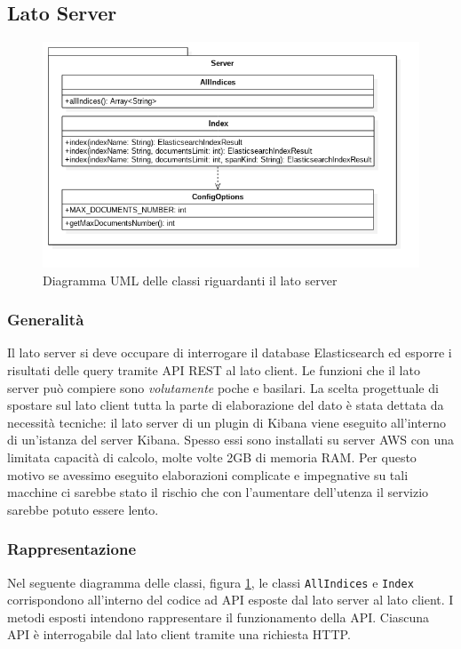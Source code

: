 
\subsection{Lato Server}


\begin{figure}[H]
	\centering
	\includegraphics[width=1\textwidth]{Images/DiagrammaClassiServer.png}
	\caption{Diagramma UML delle classi riguardanti il lato server}
	\label{img:diagrammaClassiServer}
\end{figure}

\subsubsection{Generalità}
Il lato server si deve occupare di interrogare il database Elasticsearch ed esporre i risultati delle query tramite API REST al lato client. Le funzioni che il lato server può compiere sono \emph{volutamente}  poche e basilari. La scelta progettuale di spostare sul lato client tutta la parte di elaborazione del dato è stata dettata da necessità tecniche: il lato server di un plugin di Kibana viene eseguito all'interno di un'istanza del server Kibana. Spesso essi sono installati su server AWS con una limitata capacità di calcolo, molte volte 2GB di memoria RAM. Per questo motivo se avessimo eseguito elaborazioni complicate e impegnative su tali macchine ci sarebbe stato il rischio che con l'aumentare dell'utenza il servizio sarebbe potuto essere lento.

\subsubsection{Rappresentazione}
Nel seguente diagramma delle classi, figura \ref{img:diagrammaClassiServer}, le classi \texttt{AllIndices} e \texttt{Index} corrispondono all'interno del codice ad API esposte dal lato server al lato client. I metodi esposti intendono rappresentare il funzionamento della API. Ciascuna API è interrogabile dal lato client tramite una richiesta HTTP.


